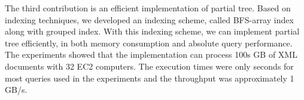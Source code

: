 \begin{abstracts}
The third contribution is an efficient implementation of partial tree. Based on
indexing techniques, we developed an indexing scheme, called BFS-array index
along with grouped index. With this indexing scheme, we can implement partial
tree efficiently, in both memory consumption and absolute query performance. The
experiments showed that the implementation can process 100s GB of XML documents
with 32 EC2 computers. The execution times were only seconds for most queries
used in the experiments and the throughput was approximately 1 GB/s.

\end{abstracts}
